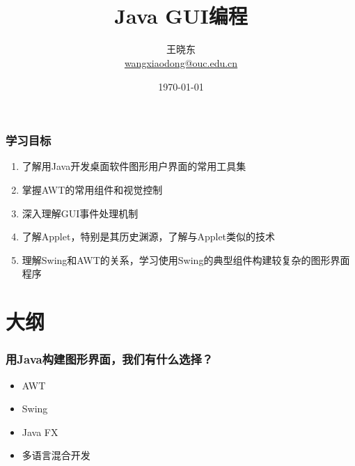 
\title[KevinW@OUC]{\\  
  Java GUI编程}
\author[王晓东]{王晓东\\
  \href{mailto:wangxiaodong@ouc.edu.cn}{\footnotesize wangxiaodong@ouc.edu.cn}}
\date{\today}


\frame{\titlepage}
\begin{frame}
  \frametitle{学习目标}
  \begin{enumerate}
  \item 了解用Java开发桌面软件图形用户界面的常用工具集
  \item 掌握AWT的常用组件和视觉控制
  \item 深入理解GUI事件处理机制
  \item 了解Applet，特别是其历史渊源，了解与Applet类似的技术
  \item 理解Swing和AWT的关系，学习使用Swing的典型组件构建较复杂的图形界面程序
  \end{enumerate}  
\end{frame}

\section*{大纲}


\begin{frame}[fragile]
  \frametitle{用Java构建图形界面，我们有什么选择？}

  \begin{itemize}
  \item AWT
  \item Swing
  \item Java FX
  \item 多语言混合开发
  \end{itemize}
\end{frame}

